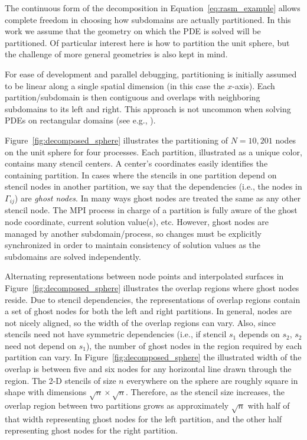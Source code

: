 \documentclass{report}
\begin{document}
The continuous form of the decomposition in Equation~\ref{eq:rasm_example} allows complete freedom in choosing how subdomains are actually partitioned. In this work we assume that the geometry on which the PDE is solved will be partitioned. Of particular interest here is how to partition the unit sphere, but the challenge of more general geometries is also kept in mind. 

For ease of development and parallel debugging, partitioning is initially
assumed to be linear along a single spatial dimension (in this case the $x$-axis). Each partition/subdomain is then contiguous and overlaps with neighboring subdomains to its left and right. This approach is not uncommon when solving PDEs on rectangular domains (see e.g., \cite{Divo2007, Thibault2009}). 


Figure~\ref{fig:decomposed_sphere} illustrates the partitioning of
$N=10,201$ nodes on the unit sphere for four processes. 
Each partition, illustrated as a unique color, contains many stencil centers.  
A center's coordinates easily identifies the containing partition. In cases where the stencils in one partition depend on stencil nodes in another partition, we say that the dependencies (i.e., the nodes in $\Gamma_{ij}$) are \emph{ghost nodes}. 
In many ways ghost nodes are treated the same as any other stencil node. The MPI process in charge of a partition is fully aware of the ghost node coordinate, current solution value(s), etc. However, ghost nodes are managed by another subdomain/process, so changes must be explicitly synchronized in order to maintain consistency of solution values as the subdomains are solved independently. 

Alternating representations between node points and interpolated surfaces in Figure~\ref{fig:decomposed_sphere} illustrates the
overlap regions where ghost nodes reside. Due to stencil dependencies, the representations of overlap regions contain a set of ghost nodes for both the left and right partitions. In general, nodes are not nicely aligned, so the width of the overlap regions can vary. Also, since stencils need not have symmetric dependencies (i.e., if stencil $s_1$ depends on $s_2$, $s_2$ need not depend on $s_1$), the number of ghost nodes in the region required by each partition can vary. In Figure~\ref{fig:decomposed_sphere} the illustrated width of the overlap is between five and six nodes for any horizontal line drawn through the region. The 2-D stencils of size $n$ everywhere on the sphere are roughly square in shape with dimensions $\sqrt{n} \times \sqrt{n}$.  Therefore, as the stencil size increases, the overlap region between two partitions grows as approximately $\sqrt{n}$ with half of that width representing ghost nodes for the left partition, and the other half representing ghost nodes for the right partition.
\end{document}
